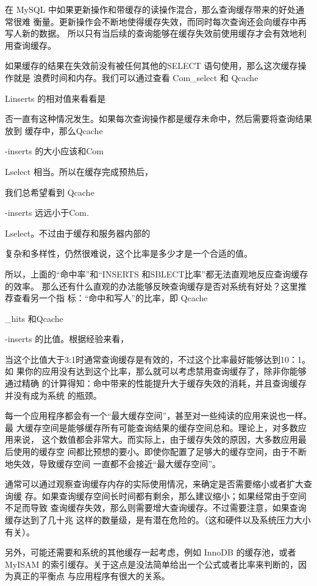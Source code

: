 在 MySQL 中如果更新操作和带缓存的读操作混合，那么查询缓存带来的好处通常很难
衡量。更新操作会不断地使得缓存失效，而同时每次查询还会向缓存中再写人新的数据。
所以只有当后续的查询能够在缓存失效前使用缓存才会有效地利用查询缓存。

如果缓存的结果在失效前没有被任何其他的SELECT 语句使用，那么这次缓存操作就是
浪费时间和内存。我们可以通过查看 Com\_select 和 Qcache

Linserts 的相对值来看看是

否一直有这种情况发生。如果每次查询操作都是缓存未命中，然后需要将查询结果放到
缓存中，那么Qcache

-inserts 的大小应该和Com

Lselect 相当。所以在缓存完成预热后，

我们总希望看到 Qcache

-inserts 远远小于Com.

Lselect。不过由于缓存和服务器内部的

复杂和多样性，仍然很难说，这个比率是多少才是一个合适的值。

所以，上面的“命中率”和“INSERTS 和SBLECT比率”都无法直观地反应查询缓存的效率。
那么还有什么直观的办法能够反映查询缓存是否对系统有好处？这里推荐查看另一个指
标：“命中和写人”的比率，即 Qcache

\_hits 和Qcache

-inserts 的比值。根据经验来看，

当这个比值大于3:1时通常查询缓存是有效的，不过这个比率最好能够达到10：1。如
果你的应用没有达到这个比率，那么就可以考虑禁用查询缓存了，除非你能够通过精确
的计算得知：命中带来的性能提升大于缓存失效的消耗，并且查询缓存并没有成为系统
的瓶颈。

每一个应用程序都会有一个“最大缓存空间”，甚至对一些纯读的应用来说也一样。最
大缓存空间是能够缓存所有可能查询结果的缓存空间总和。理论上，对多数应用来说，
这个数值都会非常大。而实际上，由于缓存失效的原因，大多数应用最后使用的缓存空
间都比预想的要小。即使你配置了足够大的缓存空间，由于不断地失效，导致缓存空间
一直都不会接近“最大缓存空间”。

通常可以通过观察查询缓存内存的实际使用情况，来确定是否需要缩小或者扩大查询缓
存。如果查询缓存空间长时间都有剩余，那么建议缩小；如果经常由于空间不足而导致
查询缓存失效，那么则需要增大查询缓存。不过需要注意，如果查询缓存达到了几十兆
这样的数量级，是有潜在危险的。（这和硬件以及系统压力大小有关）。

另外，可能还需要和系统的其他缓存一起考虑，例如 InnoDB 的缓存池，或者MyISAM
的索引缓存。关于这点是没法简单给出一个公式或者比率来判断的，因为真正的平衡点
与应用程序有很大的关系。


